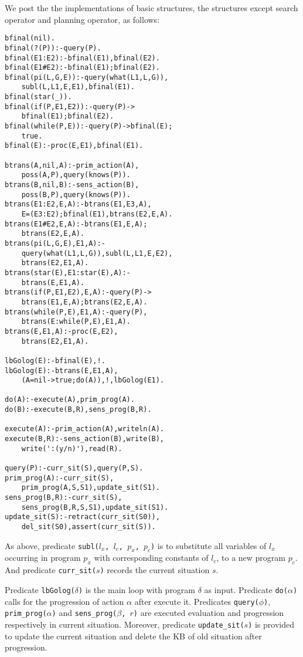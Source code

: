 \documentclass[letterpaper]{article}
\begin{document}
We post the the implementations of basic structures, the structures except search operator and planning operator, as follows:
\begin{verbatim}
bfinal(nil).
bfinal(?(P)):-query(P).
bfinal(E1:E2):-bfinal(E1),bfinal(E2).
bfinal(E1#E2):-bfinal(E1);bfinal(E2).
bfinal(pi(L,G,E)):-query(what(L1,L,G)),
    subl(L,L1,E,E1),bfinal(E1).
bfinal(star(_)).
bfinal(if(P,E1,E2)):-query(P)->
    bfinal(E1);bfinal(E2).
bfinal(while(P,E)):-query(P)->bfinal(E);
    true.
bfinal(E):-proc(E,E1),bfinal(E1).

btrans(A,nil,A):-prim_action(A),
    poss(A,P),query(knows(P)).
btrans(B,nil,B):-sens_action(B),
    poss(B,P),query(knows(P)).
btrans(E1:E2,E,A):-btrans(E1,E3,A),
    E=(E3:E2);bfinal(E1),btrans(E2,E,A).
btrans(E1#E2,E,A):-btrans(E1,E,A);
    btrans(E2,E,A).
btrans(pi(L,G,E),E1,A):-
    query(what(L1,L,G)),subl(L,L1,E,E2),
    btrans(E2,E1,A).
btrans(star(E),E1:star(E),A):-
    btrans(E,E1,A).
btrans(if(P,E1,E2),E,A):-query(P)->
    btrans(E1,E,A);btrans(E2,E,A).
btrans(while(P,E),E1,A):-query(P),
    btrans(E:while(P,E),E1,A).
btrans(E,E1,A):-proc(E,E2),
    btrans(E2,E1,A).

lbGolog(E):-bfinal(E),!.
lbGolog(E):-btrans(E,E1,A),
    (A=nil->true;do(A)),!,lbGolog(E1).

do(A):-execute(A),prim_prog(A).
do(B):-execute(B,R),sens_prog(B,R).

execute(A):-prim_action(A),writeln(A).
execute(B,R):-sens_action(B),write(B),
    write(':(y/n)'),read(R).

query(P):-curr_sit(S),query(P,S).
prim_prog(A):-curr_sit(S),
    prim_prog(A,S,S1),update_sit(S1).
sens_prog(B,R):-curr_sit(S),
    sens_prog(B,R,S,S1),update_sit(S1).
update_sit(S):-retract(curr_sit(S0)),
    del_sit(S0),assert(curr_sit(S)).
\end{verbatim}

As above, predicate \texttt{subl($l_x$, $l_c$, $p_x$, $p_c$)} is to substitute all variables of $l_x$ occurring in program $p_x$ with corresponding constants of $l_c$, to a new program $p_c$. And predicate \texttt{curr\_sit($s$)} records the current situation $s$.

Predicate \texttt{lbGolog($\delta$)} is the main loop with program $\delta$ as input. Predicate \texttt{do($\alpha$)} calls for the progression of action $\alpha$ after execute it. Predicates \texttt{query($\phi$)}, \texttt{prim\_prog($\alpha$)} and \texttt{sens\_prog($\beta$, $r$)} are executed evaluation and progression respectively in current situation. Moreover, predicate \texttt{update\_sit($s$)} is provided to update the current situation and delete the KB of old situation after progression.
\end{document}
